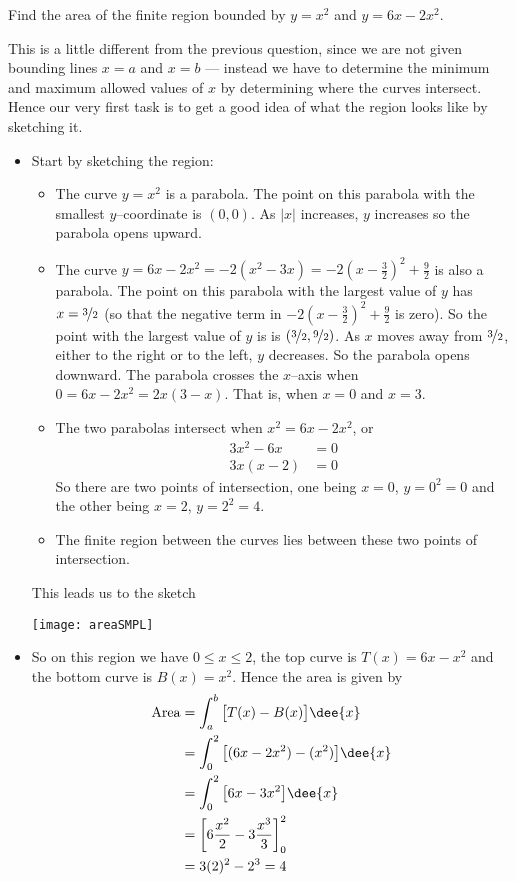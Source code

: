 \begin{eg}\label{eg:AREAa}
Find the area of the finite region bounded by $y=x^2$ and
$y=6x-2x^2$.

\soln This is a little different from the previous question, since we are not given
bounding lines $x=a$ and $x=b$ --- instead we have to determine the minimum and maximum
allowed values of $x$ by determining where the curves intersect. Hence our very first
task is to get a good idea of what the region looks like by sketching it.
\begin{itemize}
\item Start by sketching the region:
\begin{itemize}
\item The curve $y=x^2$ is a parabola. The point on this parabola with the
smallest $y$--coordinate is $(0,0)$. As $|x|$ increases, $y$ increases
so the parabola opens upward.

\item The curve $y=6x-2x^2 =-2(x^2-3x) =-2(x-\frac{3}{2})^2+\frac{9}{2}$ is also a
parabola. The point on this parabola with the largest value of $y$ has
$x=\nicefrac{3}{2}$
(so that the negative term in $-2(x-\frac{3}{2})^2+\frac{9}{2}$ is zero). So the point
with the largest value of $y$ is is $(\nicefrac{3}{2},\nicefrac{9}{2})$. As $x$ moves
away
from $\nicefrac{3}{2}$, either to the right or to the left, $y$ decreases. So the
parabola
opens downward. The parabola crosses the $x$--axis when $0=6x-2x^2=2x(3-x)$. That is,
when
$x=0$ and $x=3$.

\item The two parabolas intersect when $x^2= 6x-2x^2$, or
   \begin{align*}
      3x^2-6x&=0 \\
      3x(x-2)&=0
    \end{align*}
So there are two points of intersection, one being $x=0$, $y=0^2=0$
and the other being $x=2$, $y=2^2=4$.
\item The finite region between the curves lies between these two points of
intersection.
\end{itemize}
This leads us to the sketch
\begin{efig}
\begin{center}
   \texttt{[image: areaSMPL]}
\end{center}
\end{efig}
\item So on this region we have $0\leq x\leq 2$, the top curve is $T(x)=6x-x^2$ and the
bottom curve is $B(x)=x^2$. Hence the area is given by
\begin{align*}
  \text{Area} &=\int_a^b \big[T(x)-B(x)\big]\dee{x} \\
&=\int_0^2\big[(6x-2x^2)-(x^2)\big]\dee{x}\\
&=\int_0^2\big[6x-3x^2\big]\dee{x} \\
&=\bigg[6\frac{x^2}{2}-3\frac{x^3}{3}\bigg]_0^2\\
&=3(2)^2-2^3 =4
\end{align*}


\end{itemize}

\end{eg}

